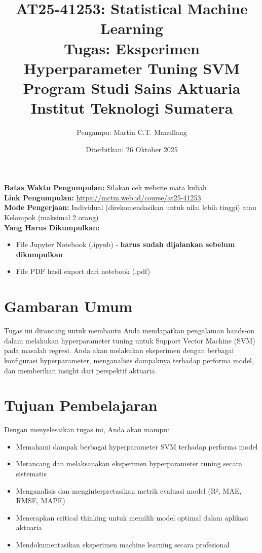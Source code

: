 \documentclass[12pt,a4paper]{article}
\title{
    \textbf{AT25-41253: Statistical Machine Learning} \\
    \Large{Tugas: Eksperimen Hyperparameter Tuning SVM} \\
    \vspace{0.5cm}
    \normalsize{Program Studi Sains Aktuaria} \\
    \normalsize{Institut Teknologi Sumatera}
}
\author{Pengampu: Martin C.T. Manullang}
\date{Diterbitkan: 26 Oktober 2025}
\begin{document}
\maketitle

\begin{tcolorbox}[colback=blue!5!white,colframe=blue!75!black,title=Informasi Penting]
\textbf{Batas Waktu Pengumpulan:} Silakan cek website mata kuliah \\
\textbf{Link Pengumpulan:} \url{https://mctm.web.id/course/at25-41253} \\
\textbf{Mode Pengerjaan:} Individual (direkomendasikan untuk nilai lebih tinggi) atau Kelompok (maksimal 2 orang) \\
\textbf{Yang Harus Dikumpulkan:} 
\begin{itemize}
    \item File Jupyter Notebook (.ipynb) - \textbf{harus sudah dijalankan sebelum dikumpulkan}
    \item File PDF hasil export dari notebook (.pdf)
\end{itemize}
\end{tcolorbox}

\section{Gambaran Umum}

Tugas ini dirancang untuk membantu Anda mendapatkan pengalaman hands-on dalam melakukan hyperparameter tuning untuk Support Vector Machine (SVM) pada masalah regresi. Anda akan melakukan eksperimen dengan berbagai konfigurasi hyperparameter, menganalisis dampaknya terhadap performa model, dan memberikan insight dari perspektif aktuaria.

\section{Tujuan Pembelajaran}

Dengan menyelesaikan tugas ini, Anda akan mampu:
\begin{itemize}
    \item Memahami dampak berbagai hyperparameter SVM terhadap performa model
    \item Merancang dan melaksanakan eksperimen hyperparameter tuning secara sistematis
    \item Menganalisis dan menginterpretasikan metrik evaluasi model (R², MAE, RMSE, MAPE)
    \item Menerapkan critical thinking untuk memilih model optimal dalam aplikasi aktuaria
    \item Mendokumentasikan eksperimen machine learning secara profesional
\end{itemize}
\end{document}
